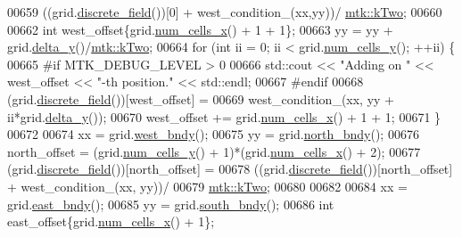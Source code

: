 \begin{DoxyCode}
00659       ((grid.\hyperlink{classmtk_1_1UniStgGrid2D_a3e72d59843a3f9c5e47da07e5850dfe0}{discrete\_field}())[0] + west\_condition\_(xx,yy))/
      \hyperlink{group__c01-roots_gaf39c2d851a2db744f4feb1c5ab3ec2cf}{mtk::kTwo};
00660 
00662     \textcolor{keywordtype}{int} west\_offset\{grid.\hyperlink{classmtk_1_1UniStgGrid2D_a2d182866a398aba8e4829590e85bf939}{num\_cells\_x}() + 1 + 1\};
00663     yy = yy + grid.\hyperlink{classmtk_1_1UniStgGrid2D_a65a78cfc80ffdbeb282ed57af4dc5cb4}{delta\_y}()/\hyperlink{group__c01-roots_gaf39c2d851a2db744f4feb1c5ab3ec2cf}{mtk::kTwo};
00664     \textcolor{keywordflow}{for} (\textcolor{keywordtype}{int} ii = 0; ii < grid.\hyperlink{classmtk_1_1UniStgGrid2D_aed05a801cc9a76dba0ff203cea58a61a}{num\_cells\_y}(); ++ii) \{
00665 \textcolor{preprocessor}{      #if MTK\_DEBUG\_LEVEL > 0}
00666       std::cout << \textcolor{stringliteral}{"Adding on "} << west\_offset << \textcolor{stringliteral}{"-th position."} << std::endl;
00667 \textcolor{preprocessor}{      #endif}
00668       (grid.\hyperlink{classmtk_1_1UniStgGrid2D_a3e72d59843a3f9c5e47da07e5850dfe0}{discrete\_field}())[west\_offset] =
00669         west\_condition\_(xx, yy + ii*grid.\hyperlink{classmtk_1_1UniStgGrid2D_a65a78cfc80ffdbeb282ed57af4dc5cb4}{delta\_y}());
00670       west\_offset += grid.\hyperlink{classmtk_1_1UniStgGrid2D_a2d182866a398aba8e4829590e85bf939}{num\_cells\_x}() + 1 + 1;
00671     \}
00672 
00674     xx = grid.\hyperlink{classmtk_1_1UniStgGrid2D_af2b1712387ded85edaf2b64617d3fc13}{west\_bndy}();
00675     yy = grid.\hyperlink{classmtk_1_1UniStgGrid2D_afe1ead253cdeb5503e0489eba8fd84e2}{north\_bndy}();
00676     north\_offset = (grid.\hyperlink{classmtk_1_1UniStgGrid2D_aed05a801cc9a76dba0ff203cea58a61a}{num\_cells\_y}() + 1)*(grid.\hyperlink{classmtk_1_1UniStgGrid2D_a2d182866a398aba8e4829590e85bf939}{num\_cells\_x}() + 2);
00677     (grid.\hyperlink{classmtk_1_1UniStgGrid2D_a3e72d59843a3f9c5e47da07e5850dfe0}{discrete\_field}())[north\_offset] =
00678       ((grid.\hyperlink{classmtk_1_1UniStgGrid2D_a3e72d59843a3f9c5e47da07e5850dfe0}{discrete\_field}())[north\_offset] + west\_condition\_(xx, yy))/
00679         \hyperlink{group__c01-roots_gaf39c2d851a2db744f4feb1c5ab3ec2cf}{mtk::kTwo};
00680 
00682 
00684     xx = grid.\hyperlink{classmtk_1_1UniStgGrid2D_a03f689eb29a6369b82ce1207c655d5ff}{east\_bndy}();
00685     yy = grid.\hyperlink{classmtk_1_1UniStgGrid2D_a1442eaf219f099d0ebf46a170fdebf92}{south\_bndy}();
00686     \textcolor{keywordtype}{int} east\_offset\{grid.\hyperlink{classmtk_1_1UniStgGrid2D_a2d182866a398aba8e4829590e85bf939}{num\_cells\_x}() + 1\};

\end{DoxyCode}
